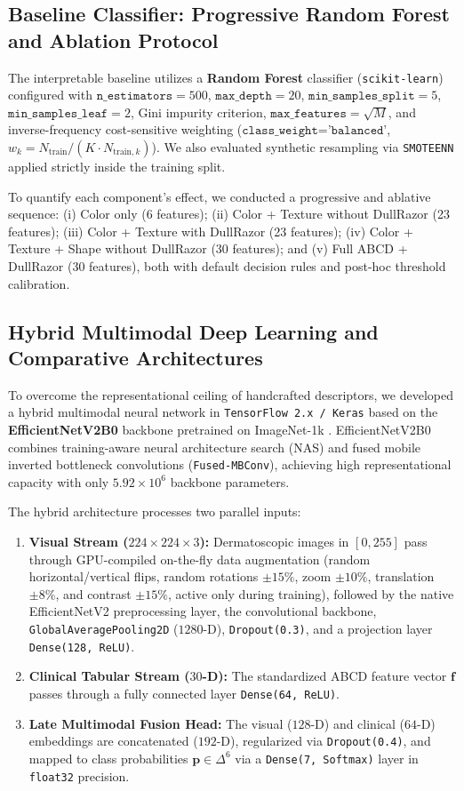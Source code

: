 \documentclass[11pt,a4paper]{article}
\begin{document}
\subsection{Baseline Classifier: Progressive Random Forest and Ablation Protocol}
The interpretable baseline utilizes a \textbf{Random Forest} classifier \cite{breiman2001} (\texttt{scikit-learn}) configured with $\texttt{n\_estimators}=500$, $\texttt{max\_depth}=20$, $\texttt{min\_samples\_split}=5$, $\texttt{min\_samples\_leaf}=2$, Gini impurity criterion, $\texttt{max\_features}=\sqrt{M}$, and inverse-frequency cost-sensitive weighting ($\texttt{class\_weight='balanced'}$, $w_k = N_{\text{train}} / (K \cdot N_{\text{train}, k})$). We also evaluated synthetic resampling via \texttt{SMOTEENN} applied strictly inside the training split.

To quantify each component's effect, we conducted a progressive and ablative sequence: (i) Color only (6 features); (ii) Color + Texture without DullRazor (23 features); (iii) Color + Texture with DullRazor (23 features); (iv) Color + Texture + Shape without DullRazor (30 features); and (v) Full ABCD + DullRazor (30 features), both with default decision rules and post-hoc threshold calibration.

\subsection{Hybrid Multimodal Deep Learning and Comparative Architectures}
To overcome the representational ceiling of handcrafted descriptors, we developed a hybrid multimodal neural network in \texttt{TensorFlow 2.x / Keras} based on the \textbf{EfficientNetV2B0} backbone \cite{tan2021} pretrained on ImageNet-1k \cite{deng2009}. EfficientNetV2B0 combines training-aware neural architecture search (NAS) and fused mobile inverted bottleneck convolutions (\texttt{Fused-MBConv}), achieving high representational capacity with only $5.92 \times 10^6$ backbone parameters.

The hybrid architecture processes two parallel inputs:
\begin{enumerate}
    \item \textbf{Visual Stream ($224 \times 224 \times 3$):} Dermatoscopic images in $[0, 255]$ pass through GPU-compiled on-the-fly data augmentation (random horizontal/vertical flips, random rotations $\pm 15\%$, zoom $\pm 10\%$, translation $\pm 8\%$, and contrast $\pm 15\%$, active only during training), followed by the native EfficientNetV2 preprocessing layer, the convolutional backbone, \texttt{GlobalAveragePooling2D} ($1280$-D), \texttt{Dropout(0.3)}, and a projection layer \texttt{Dense(128, ReLU)}.
    \item \textbf{Clinical Tabular Stream ($30$-D):} The standardized ABCD feature vector $\mathbf{f}$ passes through a fully connected layer \texttt{Dense(64, ReLU)}.
    \item \textbf{Late Multimodal Fusion Head:} The visual ($128$-D) and clinical ($64$-D) embeddings are concatenated ($192$-D), regularized via \texttt{Dropout(0.4)}, and mapped to class probabilities $\mathbf{p} \in \Delta^6$ via a \texttt{Dense(7, Softmax)} layer in \texttt{float32} precision.
\end{enumerate}
\end{document}
